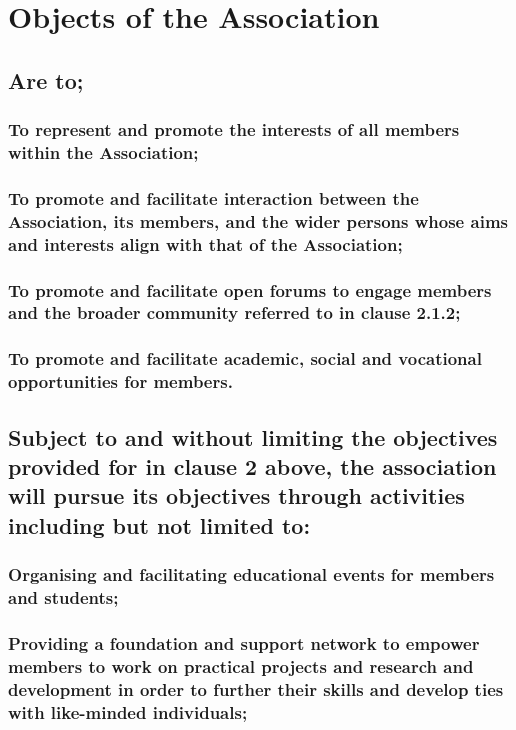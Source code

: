 \documentclass{article}
\newenvironment{subs}
  {\adjustwidth{2em}{0pt}}
  {\endadjustwidth}
\begin{document}
\section{Objects of the Association}
\begin{subs}
\subsection{Are to;}
\begin{subs}
\subsubsection{To represent and promote the interests of all members within the Association;}
\subsubsection{To promote and facilitate interaction between the Association, its members, and the wider persons whose aims and interests align with that of the Association;}
\subsubsection{To promote and facilitate open forums to engage members and the broader community referred to in clause 2.1.2;}
\subsubsection{To promote and facilitate academic, social and vocational opportunities for members.}
\end{subs}

\subsection{Subject to and without limiting the objectives provided for in clause 2 above, the association will pursue its objectives through activities including but not limited to:}

\begin{subs}
\subsubsection{Organising and facilitating educational events for members and students;}
\subsubsection{Providing a foundation and support network to empower members to work on practical projects and research and development in order to further their skills and develop ties with like-minded individuals;}

\end{subs}
\end{subs}
\end{document}
